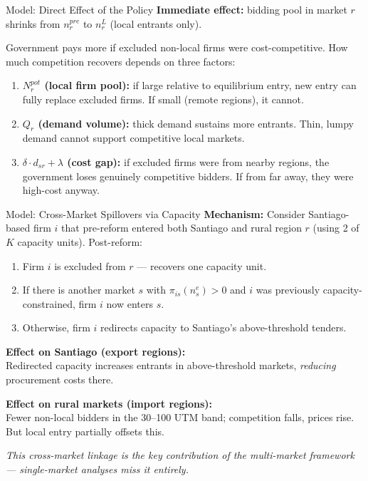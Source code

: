 \documentclass[9pt,aspectratio=169]{beamer}
\begin{document}
\begin{frame}{Model: Direct Effect of the Policy}
\textbf{Immediate effect:} bidding pool in market $r$ shrinks from
$n_r^{pre}$ to $n_r^L$ (local entrants only).

\bigskip
Government pays more if excluded non-local firms were cost-competitive.
How much competition recovers depends on three factors:

\medskip
\begin{enumerate}
  \item \textbf{$N_r^{pot}$ (local firm pool):} if large relative to equilibrium
        entry, new entry can fully replace excluded firms. If small (remote regions),
        it cannot.
  \vspace{0.3em}
  \item \textbf{$Q_r$ (demand volume):} thick demand sustains more entrants.
        Thin, lumpy demand cannot support competitive local markets.
  \vspace{0.3em}
  \item \textbf{$\delta \cdot d_{sr} + \lambda$ (cost gap):} if excluded firms
        were from nearby regions, the government loses genuinely competitive bidders.
        If from far away, they were high-cost anyway.
\end{enumerate}
\end{frame}

\begin{frame}{Model: Cross-Market Spillovers via Capacity}
\textbf{Mechanism:} Consider Santiago-based firm $i$ that pre-reform entered
both Santiago and rural region $r$ (using 2 of $K$ capacity units). Post-reform:

\begin{enumerate}
  \item Firm $i$ is excluded from $r$ --- recovers one capacity unit.
  \item If there is another market $s$ with $\pi_{is}(n_s^e) > 0$ and $i$
        was previously capacity-constrained, firm $i$ now enters $s$.
  \item Otherwise, firm $i$ redirects capacity to Santiago's
        above-threshold tenders.
\end{enumerate}

\bigskip
\textbf{Effect on Santiago (export regions):}\\
Redirected capacity increases entrants in above-threshold markets,
\emph{reducing} procurement costs there.

\medskip
\textbf{Effect on rural markets (import regions):}\\
Fewer non-local bidders in the 30--100 UTM band; competition falls,
prices rise. But local entry partially offsets this.

\bigskip
\small\textit{This cross-market linkage is the key contribution of the
multi-market framework --- single-market analyses miss it entirely.}
\end{frame}
\end{document}
